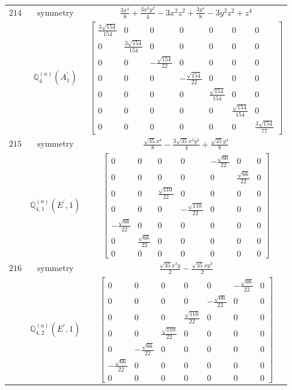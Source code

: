 \documentclass[fleqn,8pt,landscape]{jsarticle}
\begin{document}
\begin{longtable}{ccc}
$ 214 $ & $ \text{symmetry} $ & $ \frac{3 x^{4}}{8} + \frac{3 x^{2} y^{2}}{4} - 3 x^{2} z^{2} + \frac{3 y^{4}}{8} - 3 y^{2} z^{2} + z^{4} $ \\
$  $ & $ \mathbb{Q}_{4}^{(a)}(A_{1}^{\prime}) $ & $ \begin{bmatrix} \frac{3 \sqrt{154}}{154} & 0 & 0 & 0 & 0 & 0 & 0 \\ 0 & \frac{3 \sqrt{154}}{154} & 0 & 0 & 0 & 0 & 0 \\ 0 & 0 & - \frac{\sqrt{154}}{22} & 0 & 0 & 0 & 0 \\ 0 & 0 & 0 & - \frac{\sqrt{154}}{22} & 0 & 0 & 0 \\ 0 & 0 & 0 & 0 & \frac{\sqrt{154}}{154} & 0 & 0 \\ 0 & 0 & 0 & 0 & 0 & \frac{\sqrt{154}}{154} & 0 \\ 0 & 0 & 0 & 0 & 0 & 0 & \frac{3 \sqrt{154}}{77} \end{bmatrix} $ \\ \hline
$ 215 $ & $ \text{symmetry} $ & $ \frac{\sqrt{35} x^{4}}{8} - \frac{3 \sqrt{35} x^{2} y^{2}}{4} + \frac{\sqrt{35} y^{4}}{8} $ \\
$  $ & $ \mathbb{Q}_{4,1}^{(a)}(E^{\prime},1) $ & $ \begin{bmatrix} 0 & 0 & 0 & 0 & - \frac{\sqrt{66}}{22} & 0 & 0 \\ 0 & 0 & 0 & 0 & 0 & \frac{\sqrt{66}}{22} & 0 \\ 0 & 0 & \frac{\sqrt{110}}{22} & 0 & 0 & 0 & 0 \\ 0 & 0 & 0 & - \frac{\sqrt{110}}{22} & 0 & 0 & 0 \\ - \frac{\sqrt{66}}{22} & 0 & 0 & 0 & 0 & 0 & 0 \\ 0 & \frac{\sqrt{66}}{22} & 0 & 0 & 0 & 0 & 0 \\ 0 & 0 & 0 & 0 & 0 & 0 & 0 \end{bmatrix} $ \\ \hline
$ 216 $ & $ \text{symmetry} $ & $ \frac{\sqrt{35} x^{3} y}{2} - \frac{\sqrt{35} x y^{3}}{2} $ \\
$  $ & $ \mathbb{Q}_{4,2}^{(a)}(E^{\prime},1) $ & $ \begin{bmatrix} 0 & 0 & 0 & 0 & 0 & - \frac{\sqrt{66}}{22} & 0 \\ 0 & 0 & 0 & 0 & - \frac{\sqrt{66}}{22} & 0 & 0 \\ 0 & 0 & 0 & \frac{\sqrt{110}}{22} & 0 & 0 & 0 \\ 0 & 0 & \frac{\sqrt{110}}{22} & 0 & 0 & 0 & 0 \\ 0 & - \frac{\sqrt{66}}{22} & 0 & 0 & 0 & 0 & 0 \\ - \frac{\sqrt{66}}{22} & 0 & 0 & 0 & 0 & 0 & 0 \\ 0 & 0 & 0 & 0 & 0 & 0 & 0 \end{bmatrix} $ \\ \hline

\end{longtable}
\end{document}
